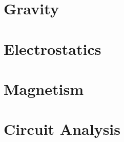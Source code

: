 \documentclass[
	11pt, %
]{LegrandOrangeBook}
\begin{document}
\part{Gravity}





 \part{Electrostatics}
 
 
 
 
 
 \part{Magnetism}
   
 
 
 
 \part{Circuit Analysis}
 
 
 
\end{document}
